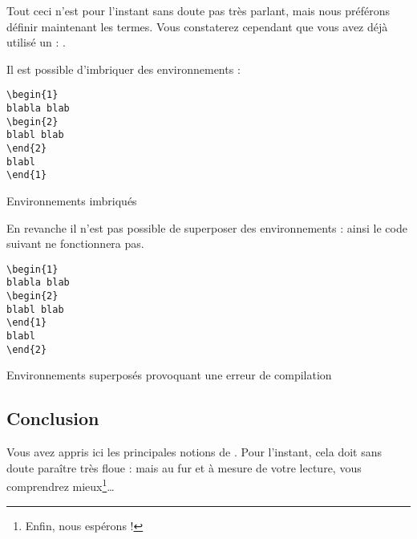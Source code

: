 Tout ceci n'est  pour l'instant sans doute pas très parlant, mais nous préférons définir maintenant les termes. Vous constaterez cependant que vous avez déjà utilisé  un  : .


Il est possible d'imbriquer des environnements :
\begin{listing}[ht]
\begin{verbatim}
\begin{1}
blabla blab
\begin{2}
blabl blab
\end{2}
blabl
\end{1}
\end{verbatim}
\caption{Environnements imbriqués}
\end{listing}
\FloatBarrier
En revanche il n'est pas possible de superposer des environnements : ainsi le code suivant ne fonctionnera pas.

\begin{listing}[ht]
\begin{verbatim}
\begin{1}
blabla blab
\begin{2}
blabl blab
\end{1}
blabl
\end{2}
\end{verbatim}
\caption{Environnements superposés provoquant une erreur de compilation}
\end{listing}
\FloatBarrier
\subsection{Conclusion}

Vous avez appris ici les principales notions de \logiciel{\LaTex}. Pour l'instant, cela doit sans doute paraître très floue : mais au fur et à mesure de votre lecture, vous comprendrez mieux\footnote{Enfin, nous espérons !}\ldots


